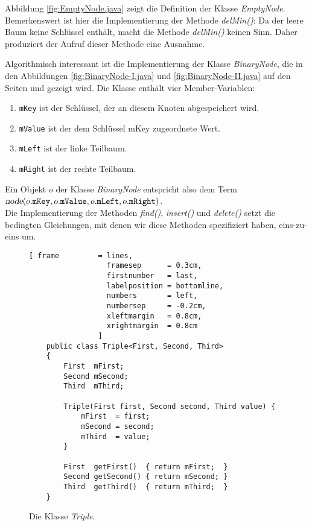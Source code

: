 Abbildung \ref{fig:EmptyNode.java} zeigt die Definition der Klasse \textsl{EmptyNode}.
Bemerkenswert ist hier die Implementierung der Methode \textsl{delMin()}: Da der leere
Baum keine Schl\"ussel enth\"alt, macht die Methode \textsl{delMin()} keinen Sinn.  Daher
produziert der Aufruf dieser Methode eine Ausnahme.


Algorithmisch interessant ist die Implementierung der Klasse \textsl{BinaryNode}, die in den
Abbildungen \ref{fig:BinaryNode-I.java} und \ref{fig:BinaryNode-II.java} auf den Seiten 
\pageref{fig:BinaryNode-I.java} und \pageref{fig:BinaryNode-II.java} gezeigt wird.
Die Klasse enth\"alt vier Member-Variablen:
\begin{enumerate}
\item \texttt{mKey} ist der Schl\"ussel, der an diesem Knoten abgespeichert wird.
\item \texttt{mValue} ist der dem Schl\"ussel \textrm{mKey} zugeordnete Wert.
\item \texttt{mLeft} ist der linke Teilbaum.
\item \texttt{mRight} ist der rechte Teilbaum.
\end{enumerate}
Ein Objekt $o$ der Klasse \textsl{BinaryNode} entspricht also dem Term \\[0.1cm]
\hspace*{1.3cm} 
$\textsl{node}(o.\texttt{mKey}, o.\texttt{mValue}, o.\texttt{mLeft}, o.\texttt{mRight})$. 
\\[0.1cm]
Die Implementierung der Methoden \textsl{find()}, \textsl{insert()} und \textsl{delete()} setzt die bedingten
Gleichungen, mit denen wir diese Methoden spezifiziert haben, eins-zu-eins um.

\begin{figure}[!ht]
  \centering
\begin{Verbatim}[ frame         = lines, 
                  framesep      = 0.3cm, 
                  firstnumber   = last,
                  labelposition = bottomline,
                  numbers       = left,
                  numbersep     = -0.2cm,
                  xleftmargin   = 0.8cm,
                  xrightmargin  = 0.8cm
                ]
    public class Triple<First, Second, Third>
    {
        First  mFirst;
        Second mSecond;
        Third  mThird;
        
        Triple(First first, Second second, Third value) {
            mFirst  = first;
            mSecond = second;
            mThird  = value;
        }
    
        First  getFirst()  { return mFirst;  }
        Second getSecond() { return mSecond; }
        Third  getThird()  { return mThird;  }
    }
\end{Verbatim}
\vspace*{-0.3cm}
  \caption{Die Klasse \textsl{Triple}.}
  \label{fig:Triple.java}
\end{figure}

